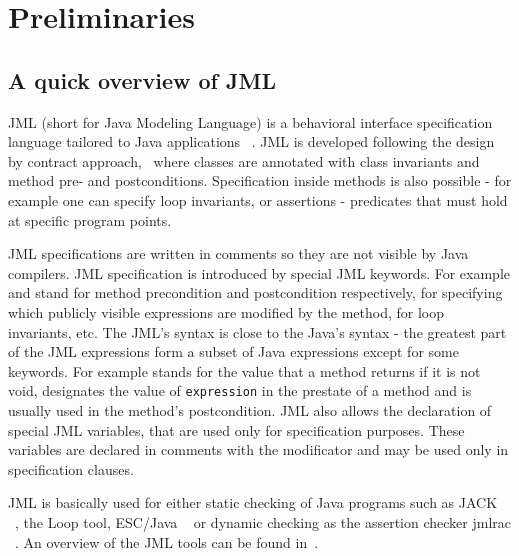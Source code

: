 \section{Preliminaries} \label{prelim}
\subsection{A quick overview of JML}
JML (short for Java Modeling Language) is a behavioral interface specification language tailored to Java applications ~\cite{JMLRefMan}. JML is developed 
following the design by contract approach,~\cite{M97oos} where classes are annotated with class invariants and method pre- and postconditions. Specification
inside methods is also possible - for example one can specify loop invariants, or assertions - predicates that must hold at specific program points. 

JML specifications are written in comments so they are not visible by Java compilers. JML specification is introduced by special JML keywords. For example  and  stand for method precondition and postcondition respectively,  for specifying which publicly visible expressions are modified by the method,  for loop invariants, etc.
The JML's syntax is close to the Java's syntax - the greatest part of the JML expressions form a subset of Java expressions except for some keywords. For example  stands for the value that a method returns if it is not void,  designates the value of \texttt{expression} in the prestate of a method and is usually used in the method's postcondition. JML also allows the declaration of special JML variables, that are used only for specification purposes. 
These variables are declared in comments with the  modificator and may be used only in specification clauses. 

JML is basically used for either static checking of Java programs such as JACK ~\cite{BR02jack}, the Loop tool, ESC/Java ~\cite{escjava} or dynamic checking as the assertion checker jmlrac ~\cite{jmlrac}. An overview of the JML tools can be found in~\cite{BurdyCCEKLLP03}.
     

